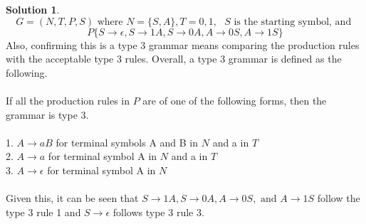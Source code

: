 \documentclass{article}
\theoremstyle{definition}
\newtheorem*{solution}{Solution}
\begin{document}
\begin{solution}
$$ G = (N,T,P,S) \mbox{ where } N = \{S,A\}, T ={0,1}, \mbox{ $S$ is the starting symbol, and }$$
$$P\{S \rightarrow \epsilon, S \rightarrow 1A, S \rightarrow 0A, A \rightarrow 0S, A \rightarrow 1S\}$$
Also, confirming this is a type 3 grammar means comparing the production rules with the acceptable type 3 rules. Overall, a type 3 grammar is defined as the following.\\\\
If all the production rules in $P$ are of one of the following forms, then the grammar is type 3.\\\\
1. $A \rightarrow aB$ for terminal symbols A and B in $N$ and a in $T$\\
2. $A \rightarrow a$ for terminal symbol A in $N$ and a in $T$\\
3. $A \rightarrow \epsilon$ for terminal symbol A in $N$\\\\
Given this, it can be seen that $S \rightarrow 1A, S \rightarrow 0A, A \rightarrow 0S, \mbox{ and } A \rightarrow 1S$ follow the type 3 rule 1 and $S \rightarrow \epsilon$ follows type 3 rule 3.
\end{solution}
\end{document}
